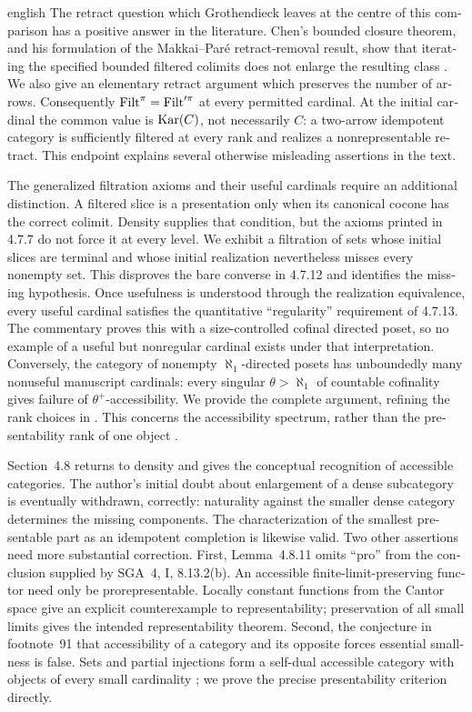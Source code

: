 \begin{otherlanguage}{english}
\begin{otherlanguage*}{english}
The retract question which Grothendieck leaves at the centre of this comparison has a positive answer in the literature. Chen's bounded closure theorem, and his formulation of the Makkai--Par\'e retract-removal result, show that iterating the specified bounded filtered colimits does not enlarge the resulting class \citep[Corollaries~4.13 and~4.15]{Chen2021Sifted}. We also give an elementary retract argument which preserves the number of arrows. Consequently $\operatorname{Filt}^\pi=\operatorname{Filt}'^\pi$ at every permitted cardinal. At the initial cardinal the common value is $\operatorname{Kar}(C)$, not necessarily $C$: a two-arrow idempotent category is sufficiently filtered at every rank and realizes a nonrepresentable retract. This endpoint explains several otherwise misleading assertions in the text.

The generalized filtration axioms and their useful cardinals require an additional distinction. A filtered slice is a presentation only when its canonical cocone has the correct colimit. Density supplies that condition, but the axioms printed in 4.7.7 do not force it at every level. We exhibit a filtration of sets whose initial slices are terminal and whose initial realization nevertheless misses every nonempty set. This disproves the bare converse in 4.7.12 and identifies the missing hypothesis. Once usefulness is understood through the realization equivalence, every useful cardinal satisfies the quantitative ``regularity'' requirement of 4.7.13. The commentary proves this with a size-controlled cofinal directed poset, so no example of a useful but nonregular cardinal exists under that interpretation. Conversely, the category of nonempty $\aleph_1$-directed posets has unboundedly many nonuseful manuscript cardinals: every singular $\theta>\aleph_1$ of countable cofinality gives failure of $\theta^+$-accessibility. We provide the complete argument, refining the rank choices in \citet[Example~3.8]{Vasey2020Accessible}. This concerns the accessibility spectrum, rather than the presentability rank of one object \citep{LiebermanRosickyVasey2019Sizes}.

Section~4.8 returns to density and gives the conceptual recognition of accessible categories. The author's initial doubt about enlargement of a dense subcategory is eventually withdrawn, correctly: naturality against the smaller dense category determines the missing components. The characterization of the smallest presentable part as an idempotent completion is likewise valid. Two other assertions need more substantial correction. First, Lemma~4.8.11 omits ``pro'' from the conclusion supplied by SGA~4, I, 8.13.2(b). An accessible finite-limit-preserving functor need only be prorepresentable. Locally constant functions from the Cantor space give an explicit counterexample to representability; preservation of all small limits gives the intended representability theorem. Second, the conjecture in footnote~91 that accessibility of a category and its opposite forces essential smallness is false. Sets and partial injections form a self-dual accessible category with objects of every small cardinality \citep[\S3.2]{Heunen2013L2}; we prove the precise presentability criterion directly.


\end{otherlanguage*}
\end{otherlanguage}
